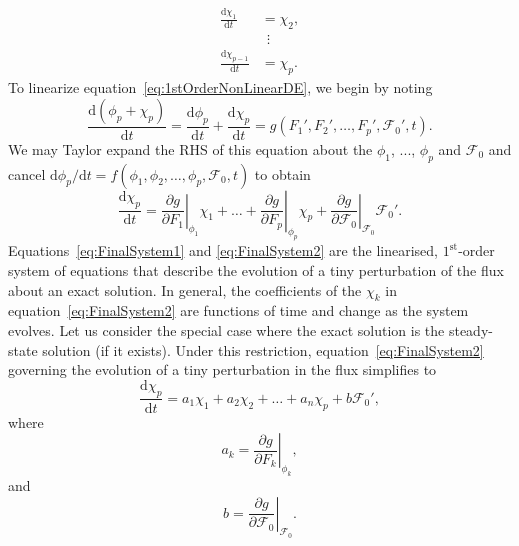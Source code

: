 \documentclass[a4paper,fleqn,usenatbib]{mnras}
\begin{document}
\begin{equation}\label{eq:FinalSystem1}
\begin{aligned}
\frac{\mathrm{d}\chi_{1}}{\mathrm{d}t} &= \chi_{2}, \\
&\ \ \vdots \\
 \frac{\mathrm{d}\chi_{p-1}}{\mathrm{d}t} &= \chi_{p}.
\end{aligned}
\end{equation}
To linearize equation~\eqref{eq:1stOrderNonLinearDE}, we begin by noting
\begin{equation}\label{eq:TempStep01}
\frac{\mathrm{d}(\phi_{p} + \chi_{p})}{\mathrm{d}t} = \frac{\mathrm{d}\phi_{p}}{\mathrm{d}t} + \frac{\mathrm{d}\chi_{p}}{\mathrm{d}t} = g(F_{1}',F_{2}',\ldots,F_{p}',\mathcal{F}_{0}',t).
\end{equation}
We may Taylor expand the RHS of this equation about the $\phi_{1}$, ..., $\phi_{p}$ and $\mathcal{F}_{0}$ and cancel $\mathrm{d}\phi_{p}/\mathrm{d}t = f(\phi_{1},\phi_{2},\ldots,\phi_{p},\mathcal{F}_{0},t)$ to obtain
\begin{equation}\label{eq:FinalSystem2}
\frac{\mathrm{d}\chi_{p}}{\mathrm{d}t} = \left.{\frac{\partial g}{\partial F_{1}}}\right \vert_{\phi_{1}} \chi_{1} + \ldots + \left.{\frac{\partial g}{\partial F_{p}}}\right \vert_{\phi_{p}} \chi_{p} + \left.{\frac{\partial g}{\partial \mathcal{F}_{0}}}\right \vert_{\mathcal{F}_{0}}\mathcal{F}_{0}'.
\end{equation}
Equations~\eqref{eq:FinalSystem1} and \eqref{eq:FinalSystem2} are the linearised, $1^{\mathrm{st}}$-order system of equations that describe the evolution of a tiny perturbation of the flux about an exact solution. In general, the coefficients of the $\chi_{k}$ in equation~\eqref{eq:FinalSystem2} are functions of time and change as the system evolves. Let us consider the special case where the exact solution is the steady-state solution (if it exists). Under this restriction, equation~\eqref{eq:FinalSystem2} governing the evolution of a tiny perturbation in the flux simplifies to
\begin{equation}\label{eq:FinalSystem3}
\frac{\mathrm{d}\chi_{p}}{\mathrm{d}t} = a_{1} \chi_{1} + a_{2} \chi_{2} + \ldots + a_{n} \chi_{p} + b \mathcal{F}_{0}',
\end{equation}
where
\begin{equation}\label{eq:aCoefficients}
a_{k} = \left.{\frac{\partial g}{\partial F_{k}}}\right \vert_{\phi_{k}},
\end{equation}
and
\begin{equation}\label{eq:bCoefficients}
b = \left.{\frac{\partial g}{\partial \mathcal{F}_{0}}}\right \vert_{\mathcal{F}_{0}}.
\end{equation}
\end{document}
